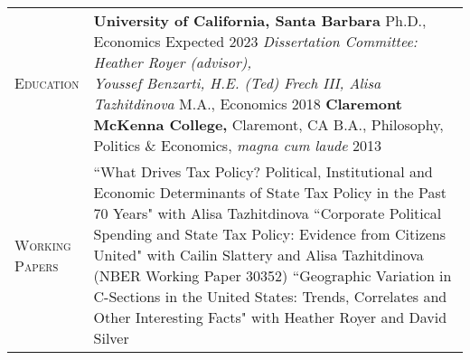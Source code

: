 \documentclass[11pt]{article}
\begin{document}
\begin{tabularx}{\textwidth}{@{}Y Z@{}}
	
	\textsc{Education} \vspace{20pt} &
	\textbf{University of California, Santa Barbara}
	\vspace{3pt} \newline
	\hspace*{15pt} Ph.D., Economics \hfill Expected 2023
	\vspace{3pt} \newline
	\hspace*{15pt} \textit{Dissertation Committee: Heather Royer (advisor), \newline \hspace*{15pt} Youssef Benzarti, H.E. (Ted) Frech III, Alisa Tazhitdinova} 
	\vspace{10pt} \newline
	\hspace*{15pt} M.A., Economics \hfill 2018
	\vspace{15pt} \newline
	\textbf{Claremont McKenna College,} Claremont, CA 
	\vspace{3pt} \newline
	\hspace*{15pt} B.A., Philosophy, Politics \& Economics, \textit{magna cum laude} \hfill 2013
	\vspace{0pt}
	\\[20pt]


	\textsc{Working \newline Papers} \vspace{20pt} & 
	``What Drives Tax Policy? Political, Institutional and Economic Determinants \newline of State Tax Policy in the Past 70 Years" with Alisa Tazhitdinova 
	\vspace{15pt} \newline
	``Corporate Political Spending and State Tax Policy: Evidence from Citizens United" \newline with Cailin Slattery and Alisa Tazhitdinova (NBER Working Paper 30352)
	\vspace{15pt} \newline
	``Geographic Variation in C-Sections in the United States: Trends, Correlates \newline and Other Interesting Facts" with Heather Royer and David Silver 
    \\[20pt]
    

\end{tabularx}
\end{document}
